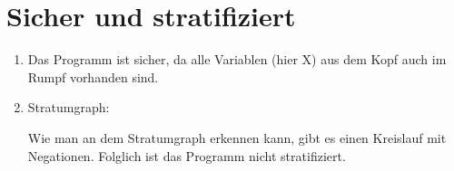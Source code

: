 \documentclass{scrartcl}
\begin{document}
\section{Sicher und stratifiziert}
\begin{enumerate}
    \item Das Programm ist sicher, da alle Variablen (hier X) aus dem Kopf auch im Rumpf vorhanden sind. 
    \item Stratumgraph:\\
    
    Wie man an dem Stratumgraph erkennen kann, gibt es einen Kreislauf mit Negationen. Folglich ist das Programm nicht stratifiziert.
\end{enumerate}
\end{document}
